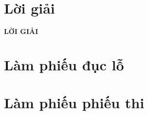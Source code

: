 \documentclass[12pt]{article}
\begin{document}
\section{Lời giải}
\setcounter{page}{1}
\inloigiai
\lamtieude
\begin{center}
{\bf LỜI GIẢI}
\end{center}
\begin{enumerate}[]
\foreachproblem[bttracnghiem]{\item\thisproblem}
\end{enumerate}
\newpage
\section{Làm phiếu đục lỗ}
\setcounter{page}{1}
\inphieuduclo
\lamphieuthi
\begin{center}
\begin{multicols}{3}
\begin{enumerate}[\causo]
\foreachproblem[bttracnghiem]{\item\thisproblem}
\end{enumerate}
\end{multicols}
\end{center}
\newpage
\section{Làm phiếu phiếu thi}
\inphieuthi
\lamphieuthi
\begin{center}
\begin{multicols}{3}
\begin{enumerate}[\causo]
\foreachproblem[bttracnghiem]{\item\thisproblem}
\end{enumerate}
\end{multicols}
\end{center}
 
\end{document}
